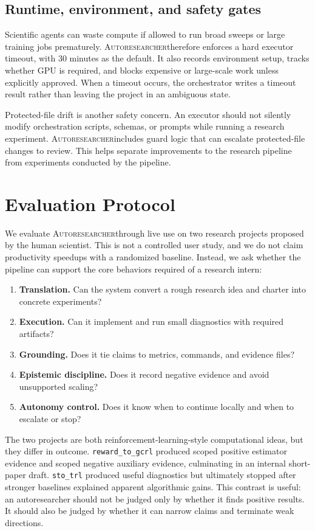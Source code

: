 \documentclass{article}
\newcommand{\sys}{\textsc{Autoresearcher}}
\begin{document}
\subsection{Runtime, environment, and safety gates}

Scientific agents can waste compute if allowed to run broad sweeps or large training jobs prematurely. \sys therefore enforces a hard executor timeout, with 30 minutes as the default. It also records environment setup, tracks whether GPU is required, and blocks expensive or large-scale work unless explicitly approved. When a timeout occurs, the orchestrator writes a timeout result rather than leaving the project in an ambiguous state.

Protected-file drift is another safety concern. An executor should not silently modify orchestration scripts, schemas, or prompts while running a research experiment. \sys includes guard logic that can escalate protected-file changes to review. This helps separate improvements to the research pipeline from experiments conducted by the pipeline.

\section{Evaluation Protocol}

We evaluate \sys through live use on two research projects proposed by the human scientist. This is not a controlled user study, and we do not claim productivity speedups with a randomized baseline. Instead, we ask whether the pipeline can support the core behaviors required of a research intern:

\begin{enumerate}[leftmargin=*]
    \item \textbf{Translation.} Can the system convert a rough research idea and charter into concrete experiments?
    \item \textbf{Execution.} Can it implement and run small diagnostics with required artifacts?
    \item \textbf{Grounding.} Does it tie claims to metrics, commands, and evidence files?
    \item \textbf{Epistemic discipline.} Does it record negative evidence and avoid unsupported scaling?
    \item \textbf{Autonomy control.} Does it know when to continue locally and when to escalate or stop?
\end{enumerate}

The two projects are both reinforcement-learning-style computational ideas, but they differ in outcome. \texttt{reward\_to\_gcrl} produced scoped positive estimator evidence and scoped negative auxiliary evidence, culminating in an internal short-paper draft. \texttt{sto\_trl} produced useful diagnostics but ultimately stopped after stronger baselines explained apparent algorithmic gains. This contrast is useful: an autoresearcher should not be judged only by whether it finds positive results. It should also be judged by whether it can narrow claims and terminate weak directions.
\end{document}
